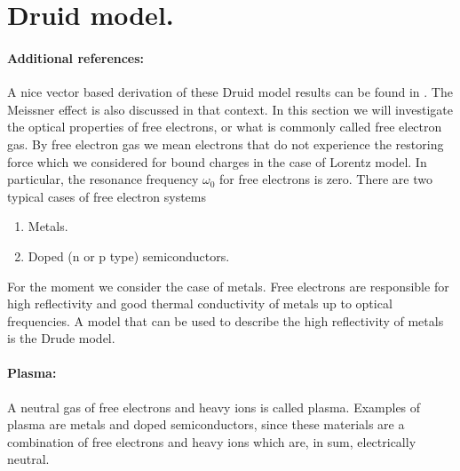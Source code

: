 \section{Druid model.}
\paragraph{Additional references:} A nice vector based derivation of these Druid model results can be found in \citep{ashcroft1976solid}.  The Meissner effect is also discussed in that context.
%
%
In this section we will investigate the optical properties of free electrons, or what is commonly called free electron gas.
%
By free electron gas we mean electrons that do not experience the restoring force which we considered for bound charges in the case of Lorentz model.  In particular, the resonance frequency \( \omega_0 \) for free electrons is zero.
%
There are two typical cases of free electron systems
%
\begin{enumerate}[a]
\item Metals.
\item Doped (n or p type) semiconductors.
\end{enumerate}
%
For the moment we consider the case of metals.
%
Free electrons are responsible for high reflectivity and good thermal conductivity of metals up to optical frequencies.  A model that can be used to describe the high reflectivity of metals is the Drude model.
%
\paragraph{Plasma:} A neutral gas of free electrons and heavy ions is called plasma.  Examples of plasma are metals and doped semiconductors, since these materials are a combination of free electrons and heavy ions which are, in sum, electrically neutral.
%
